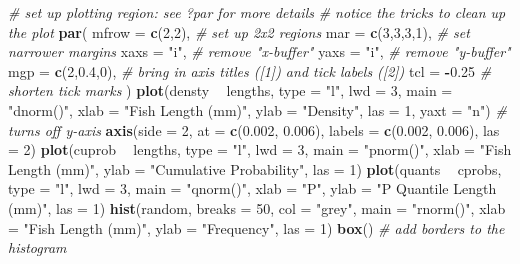 \documentclass[]{book}
\newenvironment{Shaded}{\begin{snugshade}}{\end{snugshade}}
\newcommand{\KeywordTok}[1]{\textcolor[rgb]{0.13,0.29,0.53}{\textbf{#1}}}
\newcommand{\DataTypeTok}[1]{\textcolor[rgb]{0.13,0.29,0.53}{#1}}
\newcommand{\DecValTok}[1]{\textcolor[rgb]{0.00,0.00,0.81}{#1}}
\newcommand{\FloatTok}[1]{\textcolor[rgb]{0.00,0.00,0.81}{#1}}
\newcommand{\StringTok}[1]{\textcolor[rgb]{0.31,0.60,0.02}{#1}}
\newcommand{\CommentTok}[1]{\textcolor[rgb]{0.56,0.35,0.01}{\textit{#1}}}
\newcommand{\OperatorTok}[1]{\textcolor[rgb]{0.81,0.36,0.00}{\textbf{#1}}}
\newcommand{\NormalTok}[1]{#1}
\theoremstyle{definition}
\theoremstyle{definition}
\theoremstyle{definition}
\theoremstyle{remark}
\begin{document}
\begin{Shaded}
\begin{Highlighting}[]
\CommentTok{# set up plotting region: see ?par for more details}
\CommentTok{# notice the tricks to clean up the plot}
\KeywordTok{par}\NormalTok{(}
  \DataTypeTok{mfrow =} \KeywordTok{c}\NormalTok{(}\DecValTok{2}\NormalTok{,}\DecValTok{2}\NormalTok{),    }\CommentTok{# set up 2x2 regions}
  \DataTypeTok{mar =} \KeywordTok{c}\NormalTok{(}\DecValTok{3}\NormalTok{,}\DecValTok{3}\NormalTok{,}\DecValTok{3}\NormalTok{,}\DecValTok{1}\NormalTok{),  }\CommentTok{# set narrower margins}
  \DataTypeTok{xaxs =} \StringTok{"i"}\NormalTok{,        }\CommentTok{# remove "x-buffer"}
  \DataTypeTok{yaxs =} \StringTok{"i"}\NormalTok{,        }\CommentTok{# remove "y-buffer"}
  \DataTypeTok{mgp =} \KeywordTok{c}\NormalTok{(}\DecValTok{2}\NormalTok{,}\FloatTok{0.4}\NormalTok{,}\DecValTok{0}\NormalTok{),  }\CommentTok{# bring in axis titles ([1]) and tick labels ([2])}
  \DataTypeTok{tcl =} \OperatorTok{-}\FloatTok{0.25}        \CommentTok{# shorten tick marks}
\NormalTok{)}
\KeywordTok{plot}\NormalTok{(densty }\OperatorTok{~}\StringTok{ }\NormalTok{lengths, }\DataTypeTok{type =} \StringTok{"l"}\NormalTok{, }\DataTypeTok{lwd =} \DecValTok{3}\NormalTok{, }\DataTypeTok{main =} \StringTok{"dnorm()"}\NormalTok{,}
     \DataTypeTok{xlab =} \StringTok{"Fish Length (mm)"}\NormalTok{, }\DataTypeTok{ylab =} \StringTok{"Density"}\NormalTok{, }\DataTypeTok{las =} \DecValTok{1}\NormalTok{,}
     \DataTypeTok{yaxt =} \StringTok{"n"}\NormalTok{) }\CommentTok{# turns off y-axis}
\KeywordTok{axis}\NormalTok{(}\DataTypeTok{side =} \DecValTok{2}\NormalTok{, }\DataTypeTok{at =} \KeywordTok{c}\NormalTok{(}\FloatTok{0.002}\NormalTok{, }\FloatTok{0.006}\NormalTok{), }\DataTypeTok{labels =} \KeywordTok{c}\NormalTok{(}\FloatTok{0.002}\NormalTok{, }\FloatTok{0.006}\NormalTok{), }\DataTypeTok{las =} \DecValTok{2}\NormalTok{)}
\KeywordTok{plot}\NormalTok{(cuprob }\OperatorTok{~}\StringTok{ }\NormalTok{lengths, }\DataTypeTok{type =} \StringTok{"l"}\NormalTok{, }\DataTypeTok{lwd =} \DecValTok{3}\NormalTok{, }\DataTypeTok{main =} \StringTok{"pnorm()"}\NormalTok{,}
     \DataTypeTok{xlab =} \StringTok{"Fish Length (mm)"}\NormalTok{, }\DataTypeTok{ylab =} \StringTok{"Cumulative Probability"}\NormalTok{, }\DataTypeTok{las =} \DecValTok{1}\NormalTok{)}
\KeywordTok{plot}\NormalTok{(quants }\OperatorTok{~}\StringTok{ }\NormalTok{cprobs, }\DataTypeTok{type =} \StringTok{"l"}\NormalTok{, }\DataTypeTok{lwd =} \DecValTok{3}\NormalTok{, }\DataTypeTok{main =} \StringTok{"qnorm()"}\NormalTok{,}
     \DataTypeTok{xlab =} \StringTok{"P"}\NormalTok{, }\DataTypeTok{ylab =} \StringTok{"P Quantile Length (mm)"}\NormalTok{, }\DataTypeTok{las =} \DecValTok{1}\NormalTok{)}
\KeywordTok{hist}\NormalTok{(random, }\DataTypeTok{breaks =} \DecValTok{50}\NormalTok{, }\DataTypeTok{col =} \StringTok{"grey"}\NormalTok{, }\DataTypeTok{main =} \StringTok{"rnorm()"}\NormalTok{,}
     \DataTypeTok{xlab =} \StringTok{"Fish Length (mm)"}\NormalTok{, }\DataTypeTok{ylab =} \StringTok{"Frequency"}\NormalTok{, }\DataTypeTok{las =} \DecValTok{1}\NormalTok{)}
\KeywordTok{box}\NormalTok{() }\CommentTok{# add borders to the histogram}
\end{Highlighting}
\end{Shaded}
\end{document}
